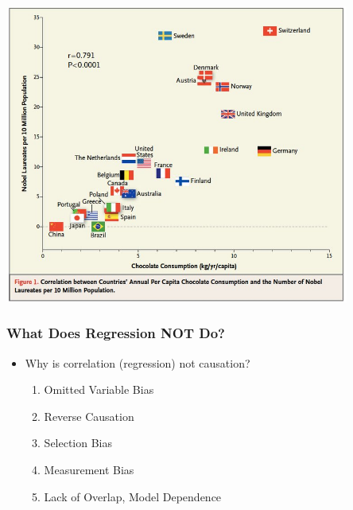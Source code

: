 \documentclass[xcolor=x11names,compress]{beamer}\usepackage[]{graphicx}\usepackage[]{color}
\renewcommand{\(}{\begin{columns}}
\renewcommand{\)}{\end{columns}}
\newcommand{\<}[1]{\begin{column}{#1}}
\renewcommand{\>}{\end{column}}
\begin{document}
\includegraphics[width=0.85\textwidth]{Chocolate_Nobel.jpg}









\begin{frame}
\frametitle{What Does Regression NOT Do?}
\begin{itemize}
\item Why is correlation (regression) not causation?
\pause
\begin{enumerate}
\item Omitted Variable Bias
\pause
\item Reverse Causation
\pause
\item Selection Bias
\pause
\item Measurement Bias
\pause
\item Lack of Overlap, Model Dependence
\end{enumerate}
\end{itemize}
\end{frame}
\end{document}
